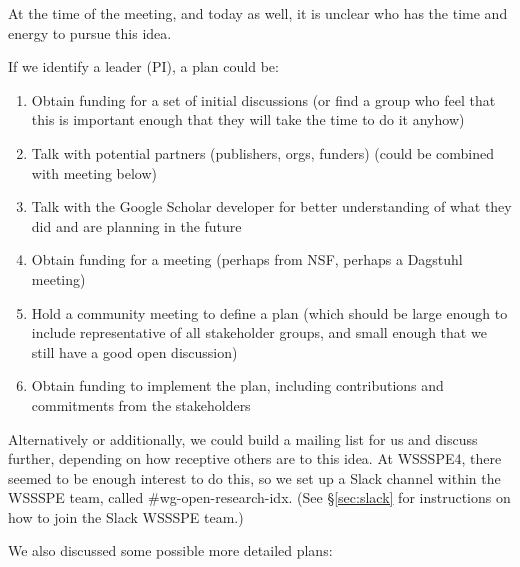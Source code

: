 At the time of the meeting, and today as well, it is unclear who has the time and energy to pursue this idea.

If we identify a leader (PI), a plan could be:
\begin{enumerate}
\item Obtain funding for a set of initial discussions (or find a group who feel that this is important enough that they will take the time to do it anyhow)
\item Talk with potential partners (publishers, orgs, funders) (could be combined with meeting below)
\item Talk with the Google Scholar developer for better understanding of what they did and are planning in the future
\item Obtain funding for a meeting (perhaps from NSF, perhaps a Dagstuhl meeting)
\item Hold a community meeting to define a plan (which should be large enough to include representative of all stakeholder groups, and small enough that we still have a good open discussion)
\item Obtain funding to implement the plan, including contributions and commitments from the stakeholders
\end{enumerate}

Alternatively or additionally, we could build a mailing list for us and discuss further, depending on how receptive others are to this idea.  At WSSSPE4, there seemed to be enough interest to do this, so we set up a Slack channel within the WSSSPE team, called \#wg-open-research-idx.  (See \S\ref{sec:slack} for instructions on how to join the Slack WSSSPE team.)

We also discussed some possible more detailed plans:

